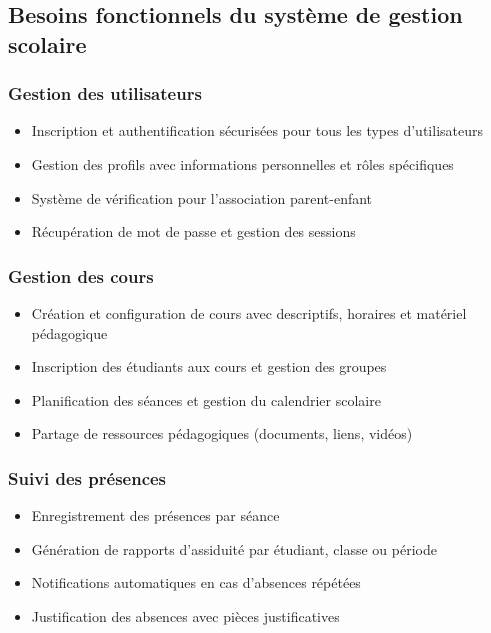 \subsection{Besoins fonctionnels du système de gestion scolaire}

\subsubsection{Gestion des utilisateurs}

\begin{itemize}
  \item Inscription et authentification sécurisées pour tous les types d'utilisateurs
  \item Gestion des profils avec informations personnelles et rôles spécifiques
  \item Système de vérification pour l'association parent-enfant
  \item Récupération de mot de passe et gestion des sessions
\end{itemize}

\subsubsection{Gestion des cours}

\begin{itemize}
  \item Création et configuration de cours avec descriptifs, horaires et matériel pédagogique
  \item Inscription des étudiants aux cours et gestion des groupes
  \item Planification des séances et gestion du calendrier scolaire
  \item Partage de ressources pédagogiques (documents, liens, vidéos)
\end{itemize}

\subsubsection{Suivi des présences}

\begin{itemize}
  \item Enregistrement des présences par séance
  \item Génération de rapports d'assiduité par étudiant, classe ou période
  \item Notifications automatiques en cas d'absences répétées
  \item Justification des absences avec pièces justificatives
\end{itemize}


